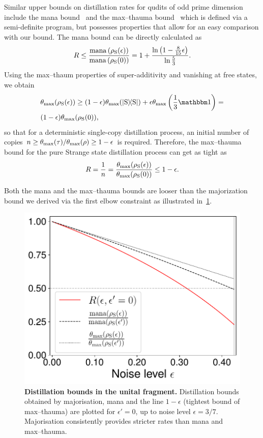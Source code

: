 \documentclass[pra,
aps,
twocolumn,
superscriptaddress,
groupedaddress,
nofootinbib,
reprint
]{revtex4-1}
\begin{document}
Similar upper bounds on distillation rates for qudits of odd prime dimension include the mana bound~\cite{cit:veitch} and the max--thauma bound~\cite{Wang2020} which is defined via a semi-definite program, but possesses properties that allow for an easy comparison with our bound.
The mana bound can be directly calculated as
\begin{equation}
	R \leq \frac{{{\rm{mana}}\left(\rho_{\rm{S}}(\epsilon)\right)}}{{{\rm{mana}}\left(\rho_{\rm{S}}(0)\right)}} = 1 + \frac{\ln \left(1 - \frac{8}{15}\epsilon \right)}{\ln \frac{5}{3}}.
\end{equation}
Using the max--thaum properties of super-additivity and vanishing at free states, we obtain
\begin{align}
	&\theta_{\rm{max}}(\rho_{\rm{S}}(\epsilon)) \geq (1-\epsilon) \theta_{\rm{max}}(\ketbra{\rm{S}}) + \epsilon \theta_{\rm{max}}\left(\frac{1}{3}\id \right) = \nonumber\\
	&(1-\epsilon) \theta_{\rm{max}}(\rho_{\rm{S}}(0)),
\end{align}
so that for a deterministic single-copy distillation process, an initial number of copies $n \geq \theta_{\rm{max}}(\tau) / \theta_{\rm{max}}(\rho) \geq 1-\epsilon$ is required.
Therefore, the max--thauma bound for the pure Strange state distillation process can get as tight as
\begin{equation}
	R = \frac{1}{n} = \frac{\theta_{\rm{max}}(\rho_{\rm{S}}(\epsilon))}{\theta_{\rm{max}}(\rho_{\rm{S}}(0))} \leq 1-\epsilon.
\end{equation}

Both the mana and the max--thauma bounds are looser than the majorization bound we derived via the first elbow constraint as illustrated in~\cref{fig:distill_bounds}.
\begin{figure}[t]
    \centering
    \includegraphics[scale=0.5]{figs/distill_bounds.pdf}
    \caption{\textbf{Distillation bounds in the unital fragment.} Distillation bounds obtained by majorisation, mana and the line $1-\epsilon$ (tightest bound of max--thauma) are plotted for $\epsilon' = 0$, up to noise level $\epsilon = 3/7$.
    Majorisation consistently provides stricter rates than mana and max--thauma.
    }
    \label{fig:distill_bounds}
\end{figure}
\end{document}
